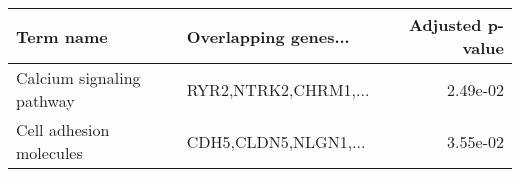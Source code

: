 \begin{tabular}{llr}
\toprule
                Term name & Overlapping genes... &  Adjusted p-value \\
\midrule
Calcium signaling pathway & RYR2,NTRK2,CHRM1,... &          2.49e-02 \\
  Cell adhesion molecules & CDH5,CLDN5,NLGN1,... &          3.55e-02 \\
\bottomrule
\end{tabular}
